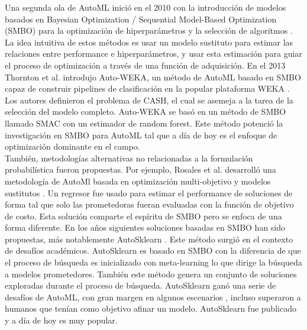 Una segunda ola de AutoML inició en el 2010 con la introducción de modelos basados en Bayesian Optimization / Sequential Model-Based Optimization (SMBO) para la optimización de hiperparámetros y la selección de algoritmos \parencite{8} \parencite{3}. La idea intuitiva de estos métodos es usar un modelo sustituto para estimar las relaciones entre performance e hiperparámetros, y usar esta estimación para guiar el proceso de optimización a través de una función de adquisición. En el 2013 Thornton et al. introdujo Auto-WEKA, un método de AutoML basado en SMBO capaz de construir pipelines de clasificación en la popular plataforma WEKA \parencite{4}. Los autores definieron el problema de CASH, el cual se asemeja a la tarea de la selección del modelo completo. Auto-WEKA se basó en un método de SMBO llamado SMAC \parencite{3} con un estimador de random forest. Este método potenció la investigación en SMBO para AutoML tal que a día de hoy es el enfoque de optimización dominante en el campo. \\

También, metodologías alternativas no relacionadas a la formulación probabilística fueron propuestas. Por ejemplo, Rosales et al. desarrolló una metodología de AutoMl basada en optimización multi-objetivo y modelos sustitutos \parencite{5}. Un regresor fue usado para estimar el performance de soluciones de forma tal que solo las prometedoras fueran evaluadas con la función de objetivo de costo. Esta solución comparte el espíritu de SMBO pero se enfoca de una forma diferente. En los años siguientes soluciones basadas en SMBO han sido propuestas, más notablemente AutoSklearn \parencite{6}. Este método surgió en el contexto de desafíos académicos. AutoSklearn es basado en SMBO con la diferencia de que el proceso de búsqueda es inicializado con meta-learning lo que dirige la búsqueda a modelos prometedores. También este método genera un conjunto de soluciones exploradas durante el proceso de búsqueda. AutoSklearn ganó una serie de desafíos de AutoML, con gran margen en algunos escenarios \parencite{7}, incluso superaron a humanos que tenían como objetivo afinar un modelo. AutoSklearn fue publicado y a día de hoy es muy popular. \\

